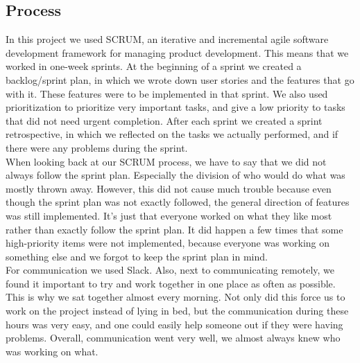 \subsection{Process}
In this project we used SCRUM, an iterative and incremental agile software development framework for managing product development. This means that we worked in one-week sprints. At the beginning of a sprint we created a backlog/sprint plan, in which we wrote down user stories and the features that go with it. These features were to be implemented in that sprint. We also used prioritization to prioritize very important tasks, and give a low priority to tasks that did not need urgent completion. After each sprint we created a sprint retrospective, in which we reflected on the tasks we actually performed, and if there were any problems during the sprint.\\
When looking back at our SCRUM process, we have to say that we did not always follow the sprint plan. Especially the division of who would do what was mostly thrown away. However, this did not cause much trouble because even though the sprint plan was not exactly followed, the general direction of features was still implemented. It's just that everyone worked on what they like most rather than exactly follow the sprint plan. It did happen a few times that some high-priority items were not implemented, because everyone was working on something else and we forgot to keep the sprint plan in mind.\\
For communication we used Slack. Also, next to communicating remotely, we found it important to try and work together in one place as often as possible. This is why we sat together almost every morning. Not only did this force us to work on the project instead of lying in bed, but the communication during these hours was very easy, and one could easily help someone out if they were having problems. Overall, communication went very well, we almost always knew who was working on what.
